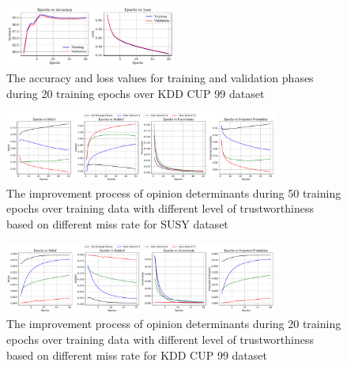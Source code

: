 \begin{figure}[ht] %
\centering
\includegraphics[width=0.5\textwidth]{figures/Results_kdd.pdf}
\caption{The accuracy and loss values for training and validation phases during 20 training epochs over KDD CUP 99 dataset}
\label{kdd_loss}
\end{figure}

\begin{figure}[!ht]  %
	\centering %
	\includegraphics[width=0.8\textwidth]{figures/Results_susy_miss.pdf}
	\vspace{-0.3cm}
	\caption{The improvement process of opinion determinants during 50 training epochs over training data with different level of trustworthiness based on different miss rate for SUSY dataset}
\label{susy_miss}
\end{figure}

\begin{figure}[!ht]
	\centering %
	\includegraphics[width=0.8\textwidth]{figures/Results_kdd_miss.pdf}
	\vspace{-0.3cm}
	\caption{The improvement process of opinion determinants during 20 training epochs over training data with different level of trustworthiness based on different miss rate for KDD CUP 99 dataset}
\label{kdd_miss}
\end{figure}









